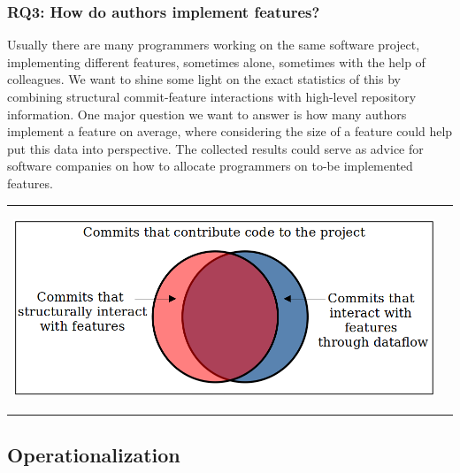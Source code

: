 \subsubsection*{\textbf{RQ3: How do authors implement features?}}

Usually there are many programmers working on the same software project, implementing different features, sometimes alone, sometimes with the help of colleagues.
We want to shine some light on the exact statistics of this by combining structural commit-feature interactions with high-level repository information.
One major question we want to answer is how many authors implement a feature on average, where considering the size of a feature could help put this data into perspective.
The collected results could serve as advice for software companies on how to allocate programmers on to-be implemented features. 

\begin{center}
\begin{tabular}{cc}
\includegraphics[height=6cm]{gfx/Commits-of-a-Software-Project.png}
\end{tabular}
\end{center}

\subsection{Operationalization}\label{sec:operationalization}

